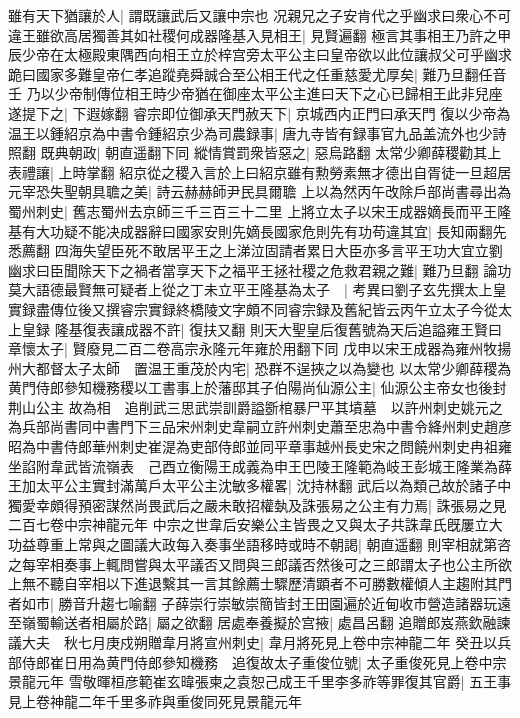 雖有天下猶讓於人|{
	謂既讓武后又讓中宗也}
况親兄之子安肯代之乎幽求曰衆心不可違王雖欲高居獨善其如社稷何成器隆基入見相王|{
	見賢遍翻}
極言其事相王乃許之甲辰少帝在太極殿東隅西向相王立於梓宫旁太平公主曰皇帝欲以此位讓叔父可乎幽求跪曰國家多難皇帝仁孝追蹤堯舜誠合至公相王代之任重慈愛尤厚矣|{
	難乃旦翻任音壬}
乃以少帝制傳位相王時少帝猶在御座太平公主進曰天下之心已歸相王此非兒座遂提下之|{
	下遐嫁翻}
睿宗即位御承天門赦天下|{
	京城西内正門曰承天門}
復以少帝為温王以鍾紹京為中書令鍾紹京少為司農録事|{
	唐九寺皆有録事官九品盖流外也少詩照翻}
既典朝政|{
	朝直遥翻下同}
縱情賞罰衆皆惡之|{
	惡烏路翻}
太常少卿薛稷勸其上表禮讓|{
	上時掌翻}
紹京從之稷入言於上曰紹京雖有勲勞素無才德出自胥徒一旦超居元宰恐失聖朝具聸之美|{
	詩云赫赫師尹民具爾聸}
上以為然丙午改除戶部尚書尋出為蜀州刺史|{
	舊志蜀州去京師三千三百三十二里}
上將立太子以宋王成器嫡長而平王隆基有大功疑不能决成器辭曰國家安則先嫡長國家危則先有功苟違其宜|{
	長知兩翻先悉薦翻}
四海失望臣死不敢居平王之上涕泣固請者累日大臣亦多言平王功大宜立劉幽求曰臣聞除天下之禍者當享天下之福平王拯社稷之危救君親之難|{
	難乃旦翻}
論功莫大語德最賢無可疑者上從之丁未立平王隆基為太子　|{
	考異曰劉子玄先撰太上皇實録盡傳位後又撰睿宗實録終橋陵文字頗不同睿宗録及舊紀皆云丙午立太子今從太上皇録}
隆基復表讓成器不許|{
	復扶又翻}
則天大聖皇后復舊號為天后追謚雍王賢曰章懷太子|{
	賢廢見二百二卷高宗永隆元年雍於用翻下同}
戊申以宋王成器為雍州牧揚州大都督太子太師　置温王重茂於内宅|{
	恐群不逞挾之以為變也}
以太常少卿薛稷為黄門侍郎參知機務稷以工書事上於藩邸其子伯陽尚仙源公主|{
	仙源公主帝女也後封荆山公主}
故為相　追削武三思武崇訓爵謚斵棺暴尸平其墳墓　以許州刺史姚元之為兵部尚書同中書門下三品宋州刺史韋嗣立許州刺史蕭至忠為中書令絳州刺史趙彦昭為中書侍郎華州刺史崔湜為吏部侍郎並同平章事越州長史宋之問饒州刺史冉祖雍坐諂附韋武皆流嶺表　己酉立衡陽王成義為申王巴陵王隆範為岐王彭城王隆業為薛王加太平公主實封滿萬戶太平公主沈敏多權畧|{
	沈持林翻}
武后以為類己故於諸子中獨愛幸頗得預密謀然尚畏武后之嚴未敢招權埶及誅張易之公主有力焉|{
	誅張易之見二百七卷中宗神龍元年}
中宗之世韋后安樂公主皆畏之又與太子共誅韋氏旣屢立大功益尊重上常與之圖議大政每入奏事坐語移時或時不朝謁|{
	朝直遥翻}
則宰相就第咨之每宰相奏事上輒問嘗與太平議否又問與三郎議否然後可之三郎謂太子也公主所欲上無不聽自宰相以下進退繫其一言其餘薦士驟歷清顕者不可勝數權傾人主趨附其門者如市|{
	勝音升趨七喻翻}
子薛崇行崇敏崇簡皆封王田園遍於近甸收市營造諸器玩遠至嶺蜀輸送者相屬於路|{
	屬之欲翻}
居處奉養擬於宫掖|{
	處昌呂翻}
追贈郎岌燕欽融諫議大夫　秋七月庚戍朔贈韋月將宣州刺史|{
	韋月將死見上卷中宗神龍二年}
癸丑以兵部侍郎崔日用為黄門侍郎參知機務　追復故太子重俊位號|{
	太子重俊死見上卷中宗景龍元年}
雪敬暉桓彦範崔玄暐張柬之袁恕己成王千里李多祚等罪復其官爵|{
	五王事見上卷神龍二年千里多祚與重俊同死見景龍元年}
